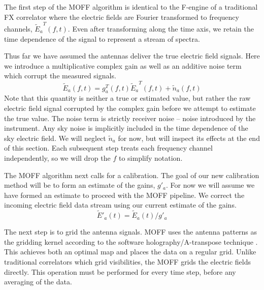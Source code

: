 \documentclass[a4paper,fleqn,usenatbib]{../mnras}
\newcommand{\Er}[1]{\ensuremath{\widetilde{E}_{#1}}}
\newcommand{\Erest}[1]{\ensuremath{\widetilde{E}'_{#1}}}
\begin{document}
The first step of the MOFF algorithm is identical to the F-engine of a traditional FX correlator where the electric fields are Fourier transformed to frequency channels, $\Er{a}^T(f,t)$. Even after transforming along the time axis, we retain the time dependence of the signal to represent a stream of spectra.

Thus far we have assumed the antennas deliver the true electric field signals. Here we introduce a multiplicative complex gain as well as an additive noise term which corrupt the measured signals.
\begin{equation}\label{eq:apply_gain}
\Er{a}(f,t) = g^T_a(f,t) \Er{a}^T(f,t) + \widetilde{n}_a(f,t)
\end{equation}
Note that this quantity is neither a true or estimated value, but rather the raw electric field signal corrupted by the complex gain before we attempt to estimate the true value. The noise term is strictly receiver noise -- noise introduced by the instrument. Any sky noise is implicitly included in the time dependence of the sky electric field. We will neglect $\widetilde{n}_a$ for now, but will inspect its effects at the end of this section. Each subsequent step treats each frequency channel independently, so we will drop the $f$ to simplify notation. 

The MOFF algorithm next calls for a calibration. The goal of our new calibration method will be to form an estimate of the gains, $g'_a$. For now we will assume we have formed an estimate to proceed with the MOFF pipeline. We correct the incoming electric field data stream using our current estimate of the gains.
\begin{equation}
\Erest{a}(t) = \Er{a}(t)/ g'_a
\end{equation}

The next step is to grid the antenna signals. MOFF uses the antenna patterns as the gridding kernel according to the software holography/A-transpose technique \citep{mor09,bha08}. This achieves both an optimal map \citep{teg97b} and places the data on a regular grid. Unlike traditional correlators which grid visibilities, the MOFF grids the electric fields directly. This operation must be performed for every time step, before any averaging of the data.
\end{document}
